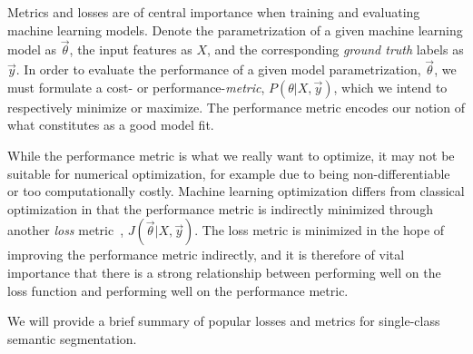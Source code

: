 Metrics and losses are of central importance when training and evaluating machine learning models.
Denote the parametrization of a given machine learning model as $\vec{\theta}$, the input features as $X$, and the corresponding \textit{ground truth} labels as $\vec{y}$.
In order to evaluate the performance of a given model parametrization, $\vec{\theta}$, we must formulate a cost- or performance-\textit{metric}, $P(\theta | X, \vec{y})$, which we intend to respectively minimize or maximize.
The performance metric encodes our notion of what constitutes as a good model fit.

While the performance metric is what we really want to optimize, it may not be suitable for numerical optimization, for example due to being non-differentiable or too computationally costly.
Machine learning optimization differs from classical optimization in that the performance metric is indirectly minimized through another \textit{loss} metric~\cite[p.~272]{goodfellow}, $J(\vec{\theta} | X, \vec{y})$.
The loss metric is minimized in the hope of improving the performance metric indirectly, and it is therefore of vital importance that there is a strong relationship between performing well on the loss function and performing well on the performance metric.

We will provide a brief summary of popular losses and metrics for single-class semantic segmentation.
